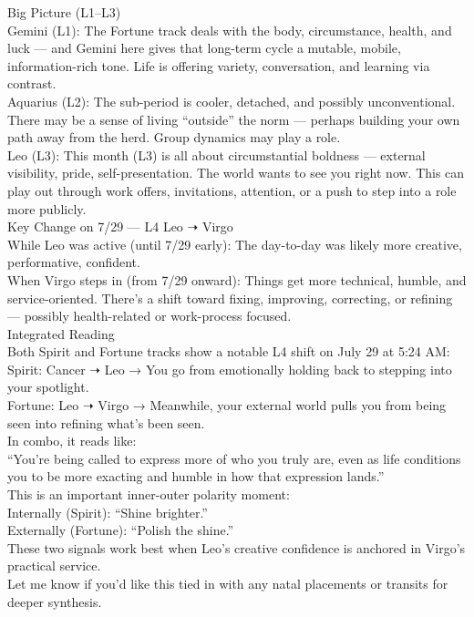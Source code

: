 \documentclass{article}
\begin{document}
Big Picture (L1--L3)\\
Gemini (L1): The Fortune track deals with the body, circumstance, health, and luck --- and Gemini here gives that long-term cycle a mutable, mobile, information-rich tone. Life is offering variety, conversation, and learning via contrast.\\
Aquarius (L2): The sub-period is cooler, detached, and possibly unconventional. There may be a sense of living ``outside'' the norm --- perhaps building your own path away from the herd. Group dynamics may play a role.\\
Leo (L3): This month (L3) is all about circumstantial boldness --- external visibility, pride, self-presentation. The world wants to see you right now. This can play out through work offers, invitations, attention, or a push to step into a role more publicly.\\
Key Change on 7/29 --- L4 Leo ➝ Virgo\\
While Leo was active (until 7/29 early): The day-to-day was likely more creative, performative, confident.\\
When Virgo steps in (from 7/29 onward): Things get more technical, humble, and service-oriented. There's a shift toward fixing, improving, correcting, or refining --- possibly health-related or work-process focused.\\
Integrated Reading\\
Both Spirit and Fortune tracks show a notable L4 shift on July 29 at 5:24 AM:\\
Spirit: Cancer ➝ Leo → You go from emotionally holding back to stepping into your spotlight.\\
Fortune: Leo ➝ Virgo → Meanwhile, your external world pulls you from being seen into refining what's been seen.\\
In combo, it reads like:\\
``You're being called to express more of who you truly are, even as life conditions you to be more exacting and humble in how that expression lands.''\\
This is an important inner-outer polarity moment:\\
Internally (Spirit): ``Shine brighter.''\\
Externally (Fortune): ``Polish the shine.''\\
These two signals work best when Leo's creative confidence is anchored in Virgo's practical service.\\
Let me know if you'd like this tied in with any natal placements or transits for deeper synthesis.\\
\end{document}
